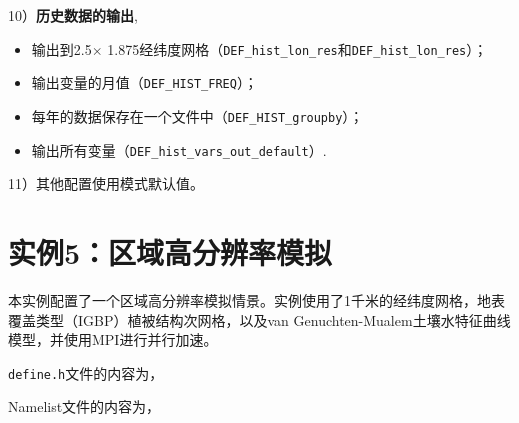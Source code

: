 10）\textbf{历史数据的输出},
\begin{itemize}[nosep,leftmargin=4em]
    \item 输出到2.5\textdegree $\times$ 1.875\textdegree 经纬度网格（\texttt{DEF\_hist\_lon\_res}和\texttt{DEF\_hist\_lon\_res}）；
    \item 输出变量的月值（\texttt{DEF\_HIST\_FREQ}）；
    \item 每年的数据保存在一个文件中（\texttt{DEF\_HIST\_groupby}）；
    \item 输出所有变量（\texttt{DEF\_hist\_vars\_out\_default}）.
\end{itemize}\par
11）其他配置使用模式默认值。

\section{实例5：区域高分辨率模拟}

本实例配置了一个区域高分辨率模拟情景。实例使用了1千米的经纬度网格，地表覆盖类型（IGBP）植被结构次网格，以及van Genuchten-Mualem土壤水特征曲线模型，并使用MPI进行并行加速。

\texttt{define.h}文件的内容为，


Namelist文件的内容为，



